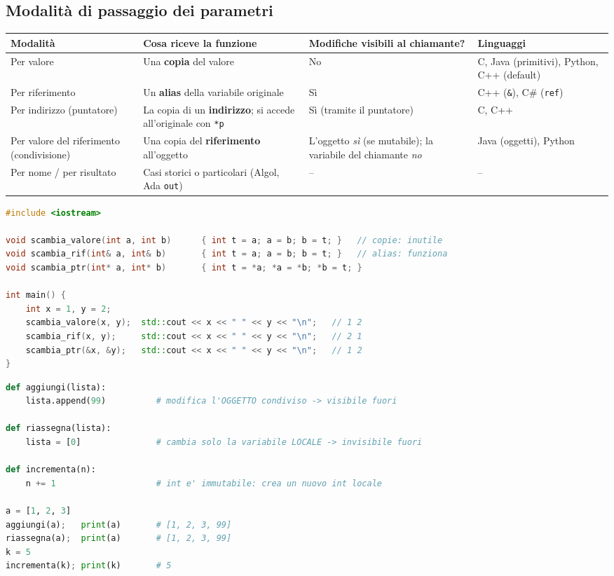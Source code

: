\subsection{Modalità di passaggio dei parametri}
\begin{center}
\small
\begin{tabularx}{\textwidth}{@{}>{\raggedright\arraybackslash}p{2.8cm}XXX@{}}
\toprule
\textbf{Modalità} & \textbf{Cosa riceve la funzione} & \textbf{Modifiche visibili al chiamante?} & \textbf{Linguaggi} \\
\midrule
Per valore & Una \textbf{copia} del valore & No & C, Java (primitivi), Python, C++ (default) \\
Per riferimento & Un \textbf{alias} della variabile originale & Sì & C++ (\texttt{\&}), C\# (\texttt{ref}) \\
Per indirizzo (puntatore) & La copia di un \textbf{indirizzo}; si accede all'originale con \texttt{*p} & Sì (tramite il puntatore) & C, C++ \\
Per valore del riferimento (condivisione) & Una copia del \textbf{riferimento} all'oggetto & L'oggetto \emph{sì} (se mutabile); la variabile del chiamante \emph{no} & Java (oggetti), Python \\
Per nome / per risultato & Casi storici o particolari (Algol, Ada \texttt{out}) & -- & -- \\
\bottomrule
\end{tabularx}
\end{center}

\begin{lstlisting}[language=C++, caption={Valore, riferimento e puntatore in C++}]
#include <iostream>

void scambia_valore(int a, int b)      { int t = a; a = b; b = t; }   // copie: inutile
void scambia_rif(int& a, int& b)       { int t = a; a = b; b = t; }   // alias: funziona
void scambia_ptr(int* a, int* b)       { int t = *a; *a = *b; *b = t; }

int main() {
    int x = 1, y = 2;
    scambia_valore(x, y);  std::cout << x << " " << y << "\n";   // 1 2
    scambia_rif(x, y);     std::cout << x << " " << y << "\n";   // 2 1
    scambia_ptr(&x, &y);   std::cout << x << " " << y << "\n";   // 1 2
}
\end{lstlisting}

\begin{lstlisting}[language=Python, caption={Python e Java: passaggio per valore del riferimento}]
def aggiungi(lista):
    lista.append(99)          # modifica l'OGGETTO condiviso -> visibile fuori

def riassegna(lista):
    lista = [0]               # cambia solo la variabile LOCALE -> invisibile fuori

def incrementa(n):
    n += 1                    # int e' immutabile: crea un nuovo int locale

a = [1, 2, 3]
aggiungi(a);   print(a)       # [1, 2, 3, 99]
riassegna(a);  print(a)       # [1, 2, 3, 99]
k = 5
incrementa(k); print(k)       # 5
\end{lstlisting}

